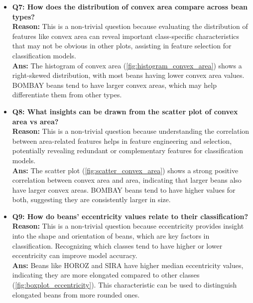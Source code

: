 \documentclass[a4paper,12pt]{article}
\begin{document}
\begin{itemize}
    \item \textbf{Q7: How does the distribution of convex area compare across bean types?}\\
    \textbf{Reason:} This is a non-trivial question because evaluating the distribution of features like convex area can reveal important class-specific characteristics that may not be obvious in other plots, assisting in feature selection for classification models.\\
    \textbf{Ans:} The histogram of convex area (\autoref{fig:histogram_convex_area}) shows a right-skewed distribution, with most beans having lower convex area values. BOMBAY beans tend to have larger convex areas, which may help differentiate them from other types.

    \item \textbf{Q8: What insights can be drawn from the scatter plot of convex area vs area?}\\
    \textbf{Reason:} This is a non-trivial question because understanding the correlation between area-related features helps in feature engineering and selection, potentially revealing redundant or complementary features for classification models.\\
    \textbf{Ans:} The scatter plot (\autoref{fig:scatter_convex_area}) shows a strong positive correlation between convex area and area, indicating that larger beans also have larger convex areas. BOMBAY beans tend to have higher values for both, suggesting they are consistently larger in size.

    \item \textbf{Q9: How do beans' eccentricity values relate to their classification?}\\
    \textbf{Reason:} This is a non-trivial question because eccentricity provides insight into the shape and orientation of beans, which are key factors in classification. Recognizing which classes tend to have higher or lower eccentricity can improve model accuracy.\\
    \textbf{Ans:} Beans like HOROZ and SIRA have higher median eccentricity values, indicating they are more elongated compared to other classes (\autoref{fig:boxplot_eccentricity}). This characteristic can be used to distinguish elongated beans from more rounded ones.

\end{itemize}




\newpage
\end{document}
